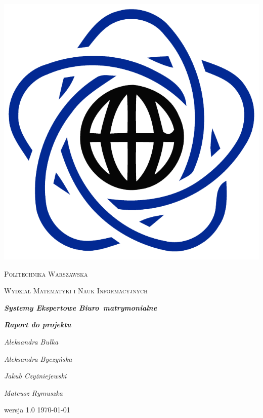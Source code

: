 \documentclass[12pt]{article}
\newcommand{\currentVersion}{1.0}
\begin{document}
\begin{titlepage}
		\centering
		\includegraphics[scale=0.15]{logo_mini.png}
		
		{\scshape\LARGE Politechnika Warszawska \par}
		{\scshape\Large Wydział Matematyki i Nauk Informacyjnych\par}
		\vspace{1.5cm}
		{\huge\bfseries \itshape Systemy Ekspertowe Biuro~matrymonialne\par}
		\vspace{0.5cm}
		{\Large \bfseries \itshape Raport do projektu\par}
		\vspace{2cm}
		{\Large\itshape Aleksandra Bułka\par}
		\vspace{0.15cm}
		{\Large\itshape Aleksandra Byczyńska\par}
		\vspace{0.15cm}
		{\Large\itshape Jakub Czyżniejewski\par}
		\vspace{0.15cm}
		{\Large\itshape Mateusz Rymuszka\par}
		\vfill
		wersja \currentVersion
		\vfill
		\today
		\vfill
	\end{titlepage}
\end{document}
